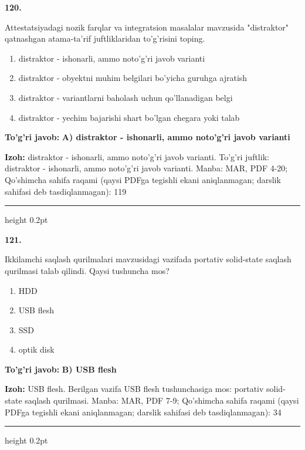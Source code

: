 \documentclass[10pt,a4paper]{article}
\begin{document}
{\bfseries\sffamily\color{ink} 120.}
\par
Attestatsiyadagi nozik farqlar va integratsion masalalar mavzusida "distraktor" qatnashgan atama-ta'rif juftliklaridan to'g'risini toping.
\begin{enumerate}[label=\Alph*),leftmargin=9mm]
\item distraktor - ishonarli, ammo noto'g'ri javob varianti
\item distraktor - obyektni muhim belgilari bo'yicha guruhga ajratish
\item distraktor - variantlarni baholash uchun qo'llanadigan belgi
\item distraktor - yechim bajarishi shart bo'lgan chegara yoki talab
\end{enumerate}
\begin{tcolorbox}[enhanced,breakable,colback=teal!4,colframe=teal!60!black,boxrule=0.45pt,arc=1.2mm,left=2.7mm,right=2.7mm,top=1.8mm,bottom=1.8mm,before skip=2mm,after skip=2mm]
{\bfseries\sffamily\color{teal}To'g'ri javob:} \textbf{A) distraktor - ishonarli, ammo noto'g'ri javob varianti}
\par\smallskip
{\bfseries Izoh:} distraktor - ishonarli, ammo noto'g'ri javob varianti. To'g'ri juftlik: distraktor - ishonarli, ammo noto'g'ri javob varianti. Manba: MAR, PDF 4-20; Qo'shimcha sahifa raqami (qaysi PDFga tegishli ekani aniqlanmagan; darslik sahifasi deb tasdiqlanmagan): 119
\end{tcolorbox}
\vspace{2mm}\hrule height 0.2pt\vspace{3mm}

{\bfseries\sffamily\color{ink} 121.}
\par
Ikkilamchi saqlash qurilmalari mavzusidagi vazifada portativ solid-state saqlash qurilmasi talab qilindi. Qaysi tushuncha mos?
\begin{enumerate}[label=\Alph*),leftmargin=9mm]
\item HDD
\item USB flesh
\item SSD
\item optik disk
\end{enumerate}
\begin{tcolorbox}[enhanced,breakable,colback=teal!4,colframe=teal!60!black,boxrule=0.45pt,arc=1.2mm,left=2.7mm,right=2.7mm,top=1.8mm,bottom=1.8mm,before skip=2mm,after skip=2mm]
{\bfseries\sffamily\color{teal}To'g'ri javob:} \textbf{B) USB flesh}
\par\smallskip
{\bfseries Izoh:} USB flesh. Berilgan vazifa USB flesh tushunchasiga mos: portativ solid-state saqlash qurilmasi. Manba: MAR, PDF 7-9; Qo'shimcha sahifa raqami (qaysi PDFga tegishli ekani aniqlanmagan; darslik sahifasi deb tasdiqlanmagan): 34
\end{tcolorbox}
\vspace{2mm}\hrule height 0.2pt\vspace{3mm}
\end{document}
